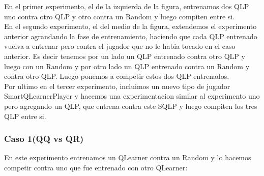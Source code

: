 \documentclass[10pt, a4paper]{article}
\begin{document}
En el primer experimento, el de la izquierda de la figura, entrenamos dos QLP uno contra otro QLP y otro contra un Random y luego compiten entre si.\\

En el segundo experimento, el del medio de la figura, extendemos el experimento anterior agrandando la fase de entrenamiento, haciendo que cada QLP entrenado vuelva a entrenar pero contra el jugador que no le habia tocado en el caso anterior. Es decir tenemos por un lado un QLP entrenado contra otro QLP y luego con un Random y por otro lado un QLP entrenado contra un Random y contra otro QLP. Luego ponemos a competir estos dos QLP entrenados.\\

Por ultimo en el tercer experimento, incluimos un nuevo tipo de jugador SmartQLearnerPlayer y hacemos una experimentacion similar al experimento uno pero agregando un QLP, que entrena contra este SQLP y luego compiten los tres QLP entre si.\\


\subsubsection{Caso 1(QQ vs QR)}


En este experimento entrenamos un QLearner contra un Random y lo hacemos competir contra uno que fue entrenado con otro QLearner:
\end{document}
